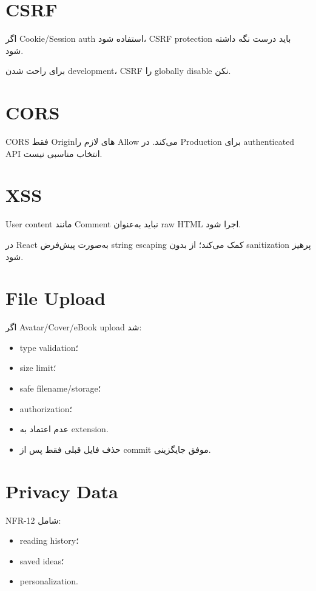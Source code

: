 \section{CSRF}

اگر Cookie/Session auth استفاده شود، CSRF protection باید درست نگه داشته شود.

\begin{warningbox}
برای راحت شدن development، CSRF را globally disable نکن.
\end{warningbox}

\section{CORS}

CORS فقط Originهای لازم را Allow می‌کند. \eng{*} در Production برای authenticated API انتخاب مناسبی نیست.

\section{XSS}

User content مانند Comment نباید به‌عنوان raw HTML اجرا شود.

در React به‌صورت پیش‌فرض string escaping کمک می‌کند؛ از  بدون sanitization پرهیز شود.

\section{File Upload}

اگر Avatar/Cover/eBook upload شد:
\begin{itemize}
  \item type validation؛
  \item size limit؛
  \item safe filename/storage؛
  \item authorization؛
  \item عدم اعتماد به extension.
  \item حذف فایل قبلی فقط پس از commit موفق جایگزینی.
\end{itemize}

\section{Privacy Data}

NFR-12 شامل:
\begin{itemize}
  \item reading history؛
  \item saved ideas؛
  \item personalization.
\end{itemize}

